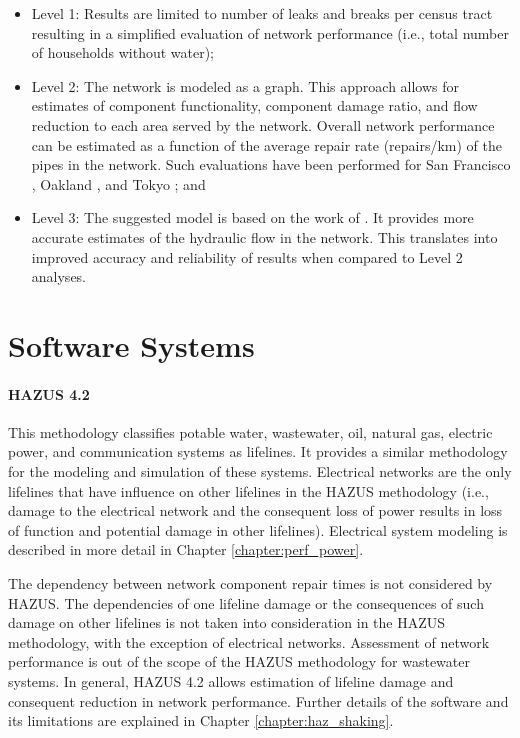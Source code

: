 \begin{itemize}
    \item Level 1: Results are limited to number of leaks and breaks per census tract resulting in a simplified evaluation of network performance (i.e., total number of households without water);

    \item Level 2: The network is modeled as a graph. This approach allows for estimates of component functionality, component damage ratio, and flow reduction to each area served by the network. Overall network performance can be estimated as a function of the average repair rate (repairs/km) of the pipes in the network. Such evaluations have been performed for San Francisco \citep{markov1994evaluation}, Oakland \citep{geengineeringsystems1994nibs}, and Tokyo \citep{isoyama1982reliability}; and
    
    \item Level 3: The suggested model is based on the work of \cite{khater1999potable}. It provides more accurate estimates of the hydraulic flow in the network. This translates into improved accuracy and reliability of results when compared to Level 2 analyses.
\end{itemize}

\section{Software Systems}
\label{sec:perf_pipeline_tools}

\paragraph{HAZUS 4.2} This methodology classifies potable water, wastewater, oil, natural gas, electric power, and communication systems as lifelines. It provides a similar methodology for the modeling and simulation of these systems. Electrical networks are the only lifelines that have influence on other lifelines in the HAZUS methodology (i.e., damage to the electrical network and the consequent loss of power results in loss of function and potential damage in other lifelines). Electrical system modeling is described in more detail in Chapter \ref{chapter:perf_power}.

The dependency between network component repair times is not considered by HAZUS. The dependencies of one lifeline damage or the consequences of such damage on other lifelines is not taken into consideration in the HAZUS methodology, with the exception of electrical networks. Assessment of network performance is out of the scope of the HAZUS methodology for wastewater systems. In general, HAZUS 4.2 allows estimation of lifeline damage and consequent reduction in network performance. Further details of the software and its limitations are explained in Chapter \ref{chapter:haz_shaking}.

